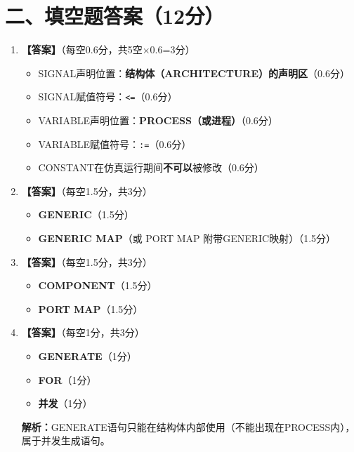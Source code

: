 \section{二、填空题答案（12分）}

\begin{enumerate}[label=\arabic*.]

\item \textbf{【答案】}（每空0.6分，共5空$\times$0.6=3分）
\begin{itemize}
  \item SIGNAL声明位置：\textbf{结构体（ARCHITECTURE）的声明区}\hfill（0.6分）
  \item SIGNAL赋值符号：\texttt{<=}\hfill（0.6分）
  \item VARIABLE声明位置：\textbf{PROCESS（或进程）}\hfill（0.6分）
  \item VARIABLE赋值符号：\texttt{:=}\hfill（0.6分）
  \item CONSTANT在仿真运行期间\textbf{不可以}被修改\hfill（0.6分）
\end{itemize}

\item \textbf{【答案】}\hfill（每空1.5分，共3分）
\begin{itemize}
  \item \textbf{GENERIC}\hfill（1.5分）
  \item \textbf{GENERIC MAP}（或 PORT MAP 附带GENERIC映射）\hfill（1.5分）
\end{itemize}

\item \textbf{【答案】}\hfill（每空1.5分，共3分）
\begin{itemize}
  \item \textbf{COMPONENT}\hfill（1.5分）
  \item \textbf{PORT MAP}\hfill（1.5分）
\end{itemize}

\item \textbf{【答案】}\hfill（每空1分，共3分）
\begin{itemize}
  \item \textbf{GENERATE}\hfill（1分）
  \item \textbf{FOR}\hfill（1分）
  \item \textbf{并发}\hfill（1分）
\end{itemize}
\textbf{解析：}GENERATE语句只能在结构体内部使用（不能出现在PROCESS内），属于并发生成语句。

\end{enumerate}

